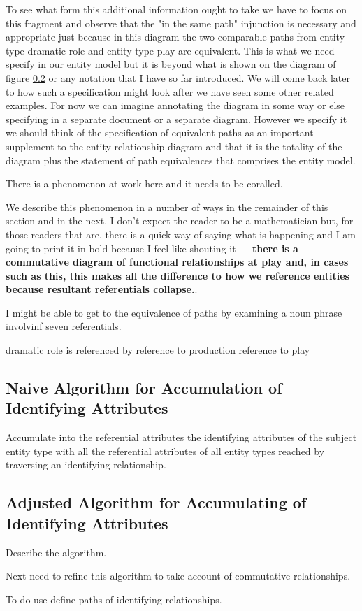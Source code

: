 To see what form this additional information ought to take we have to focus on this fragment
and observe that the "in the same path" injunction is necessary and appropriate just because in this diagram the two comparable paths from entity type dramatic role and entity type play are equivalent.
This is what we need specify in our entity model but it is beyond what is shown on the diagram of figure \ref{} or any notation that I have so far introduced.
We will come back later to how such a specification might look after we have seen some other 
related examples.
For now we can imagine annotating the diagram in some way or else specifying in a separate document
or a separate diagram. However we specify it we should think of the specification of equivalent paths as 
an important supplement to the entity relationship diagram and that it is the totality of the diagram plus the statement of path equivalences that comprises the entity model.

There is a phenomenon at work here and it needs to be coralled.

We describe this phenomenon in a number of ways in the remainder of this section and in the next. 
I don't expect the reader to be a mathematician but, for those readers that are, there is a quick way of saying what is happening and I am going to print it in bold because I feel like shouting it  --- \textbf{there is a commutative diagram of functional relationships at play and, in cases such as this, this makes all the difference to how we reference entities because resultant referentials collapse.}.

\begin{noteforfuture}
I might be able to get to the equivalence of paths by examining
a noun phrase involvinf seven referentials.

dramatic role is referenced by reference to production reference to play
\end{noteforfuture}
\subsection{Naive Algorithm for Accumulation of Identifying Attributes}
Accumulate into the referential attributes the identifying attributes of the subject entity type
with all the referential attributes of all entity types reached by traversing an identifying relationship.
\subsection{Adjusted Algorithm for Accumulating of Identifying Attributes}

Describe the algorithm.

Next need to refine this algorithm to take account of commutative relationships. 

To do use define paths of identifying relationships.
